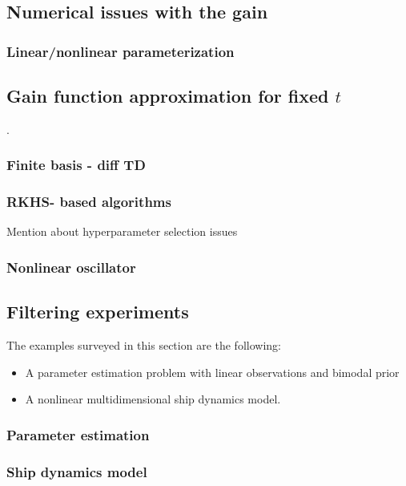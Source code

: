 	\subsection{Numerical issues with the gain}
	
	\subsubsection{Linear/nonlinear parameterization}
	
	\subsection{Gain function approximation for fixed $t$}.
	\subsubsection{Finite basis - diff TD}
	\subsubsection{RKHS- based algorithms}
	Mention about hyperparameter selection issues
	
	\subsubsection{Nonlinear oscillator}
	 \label{s:nl_oscillator}
	\subsection{Filtering experiments}
	\label{s:filtering_experiments}
	The examples surveyed in this section are the following:
	\begin{itemize}
		\item A parameter estimation problem with linear observations and bimodal prior
		\item A nonlinear multidimensional ship dynamics model.
	\end{itemize}
	\subsubsection{Parameter estimation}
	\label{s:param_estimation}
	\subsubsection{Ship dynamics model} 
	\label{s:ship_dynamics}
	
	





